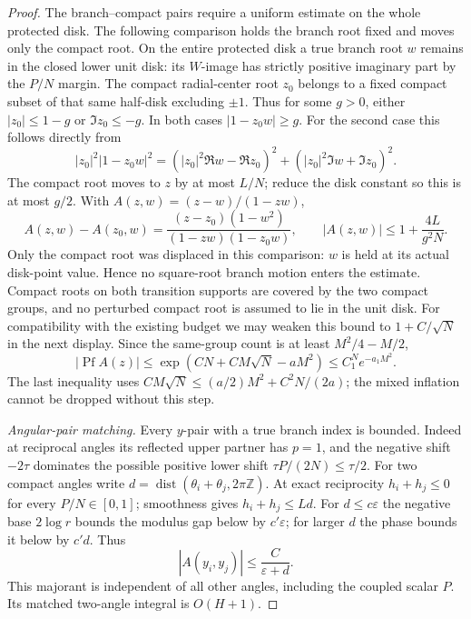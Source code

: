 \documentclass[11pt]{article}
\numberwithin{equation}{section}
\theoremstyle{definition}
\newcommand{\Z}{\mathbb Z}
\newcommand{\eps}{\varepsilon}
\newcommand{\Pf}{\operatorname{Pf}}
\newcommand{\dist}{\operatorname{dist}}
\begin{document}
\begin{proof}
The branch--compact pairs require a uniform estimate on the whole
protected disk. The following comparison holds the branch root fixed
and moves only the compact root. On the entire protected
disk a true branch root \(w\) remains in the closed lower unit disk:
its \(W\)-image has strictly positive imaginary part by the
\(P/N\) margin. The compact radial-center root \(z_0\) belongs to
a fixed compact subset of that same half-disk excluding \(\pm1\).
Thus for some \(g>0\), either \(|z_0|\le1-g\) or
\(\Im z_0\le-g\). In both cases \(|1-z_0w|\ge g\).
For the second case this follows directly from
\[
 |z_0|^2|1-z_0w|^2
 =(|z_0|^2\Re w-\Re z_0)^2+
   (|z_0|^2\Im w+\Im z_0)^2.
\]
The compact root moves to \(z\) by at most \(L/N\); reduce the
disk constant so this is at most \(g/2\). With
\(A(z,w)=(z-w)/(1-zw)\),
\[
 A(z,w)-A(z_0,w)=\frac{(z-z_0)(1-w^2)}{(1-zw)(1-z_0w)},\qquad
 |A(z,w)|\le1+\frac{4L}{g^2N}.
\]
Only the compact root was displaced in this comparison: \(w\)
is held at its actual disk-point value. Hence no square-root branch
motion enters the estimate. Compact roots on both transition supports
are covered by the two compact groups, and no perturbed compact root
is assumed to lie in the unit disk. For compatibility with the existing
budget we may weaken this bound to \(1+C/\sqrt N\) in the next display.
Since the same-group count is at least \(M^2/4-M/2\),
\[
 |\Pf A(z)|\le
 \exp(CN+CM\sqrt N-aM^2)\le C_1^N e^{-a_1M^2}.
\]
The last inequality uses
\(CM\sqrt N\le(a/2)M^2+C^2N/(2a)\); the mixed inflation cannot be
dropped without this step.

\smallskip\noindent\textit{Angular-pair matching.}
Every \(y\)-pair with a true branch index is bounded. Indeed at
reciprocal angles its reflected upper partner has \(p=1\), and
the negative shift \(-2\tau\) dominates the possible positive
lower shift \(\tau P/(2N)\le\tau/2\).
For two compact angles write
\(d=\dist(\theta_i+\theta_j,2\pi\Z)\).
At exact reciprocity \(h_i+h_j\le0\) for every \(P/N\in[0,1]\);
smoothness gives \(h_i+h_j\le Ld\).
For \(d\le c\eps\) the negative base \(2\log r\) bounds the
modulus gap below by \(c'\eps\); for larger \(d\) the phase
bounds it below by \(c'd\). Thus
\[
 |A(y_i,y_j)|\le\frac C{\eps+d}.
\]
This majorant is independent of all other angles, including the
coupled scalar \(P\). Its matched two-angle integral is \(O(H+1)\).


\end{proof}
\end{document}

